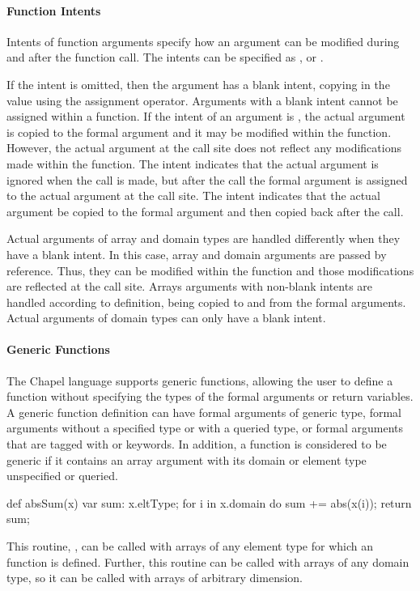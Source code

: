\paragraph{Function Intents}
Intents of function arguments specify how an argument can be
modified during and after the function call. 
The intents can be specified as ,  or .

If the intent is omitted, then the
argument has a blank intent, copying in the value using the assignment 
operator.  Arguments with a blank intent cannot be assigned within a function.
If the intent of an argument is , the actual argument is copied 
to the formal argument and it may be modified within the function.  However, 
the actual argument at the call site does not reflect any modifications 
made within the function.  The  intent indicates that the 
actual argument is ignored when the call is made, but after the
call the formal argument is assigned to the actual argument at the call site.
The  intent indicates that the actual argument be copied to 
the formal argument and then copied back after the call.

Actual arguments of array and domain types are handled differently when
they have a blank intent.  In this case, array and domain arguments are 
passed by reference.  Thus, they can be modified within the function and 
those modifications are reflected at the call site.  Arrays arguments 
with non-blank intents are handled according to definition, being copied 
to and from the formal arguments.  Actual arguments of domain types can
only have a blank intent.

\paragraph{Generic Functions}
The Chapel language supports generic functions, allowing the user
to define a function without specifying the types of the formal arguments
or return variables.  A generic function definition can have formal arguments  
of generic type, formal arguments without a specified type or 
with a queried type, or formal arguments that are tagged with 
 or  keywords.  In addition, a function is
considered to be generic if it contains an array argument with its
domain or element type unspecified or queried.

\begin{example}
\begin{chapel}
def absSum(x) {
  var sum: x.eltType;
  for i in x.domain do sum += abs(x(i));
  return sum;
}
\end{chapel}
This routine, , can be called
with arrays of any element type for which an  function is
defined.  Further, this routine can be called with arrays of 
any domain type, so it can be called with arrays of arbitrary dimension.
\end{example}

